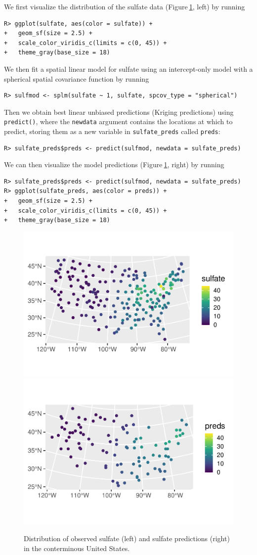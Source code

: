 \documentclass[10pt,letterpaper]{article}
\begin{document}
We first visualize the distribution of the sulfate data
(Figure\(~\)\ref{fig:sulfate}, left) by running

\begin{verbatim}
R> ggplot(sulfate, aes(color = sulfate)) +
+   geom_sf(size = 2.5) +
+   scale_color_viridis_c(limits = c(0, 45)) +
+   theme_gray(base_size = 18)
\end{verbatim}

We then fit a spatial linear model for sulfate using an intercept-only
model with a spherical spatial covariance function by running

\begin{verbatim}
R> sulfmod <- splm(sulfate ~ 1, sulfate, spcov_type = "spherical")
\end{verbatim}

Then we obtain best linear unbiased predictions (Kriging predictions)
using \texttt{predict()}, where the \texttt{newdata} argument contains
the locations at which to predict, storing them as a new variable in
\texttt{sulfate\_preds} called \texttt{preds}:

\begin{verbatim}
R> sulfate_preds$preds <- predict(sulfmod, newdata = sulfate_preds)
\end{verbatim}

We can then visualize the model predictions
(Figure\(~\)\ref{fig:sulfate}, right) by running

\begin{verbatim}
R> sulfate_preds$preds <- predict(sulfmod, newdata = sulfate_preds)
R> ggplot(sulfate_preds, aes(color = preds)) +
+   geom_sf(size = 2.5) +
+   scale_color_viridis_c(limits = c(0, 45)) +
+   theme_gray(base_size = 18)
\end{verbatim}

\begin{figure}

{\centering \includegraphics[width=0.49\linewidth]{preprint_old_files/figure-latex/sulfate-1} \includegraphics[width=0.49\linewidth]{preprint_old_files/figure-latex/sulfate-2} 

}

\caption{Distribution of observed sulfate (left) and sulfate predictions (right) in the conterminous United States.}\label{fig:sulfate}
\end{figure}
\end{document}
